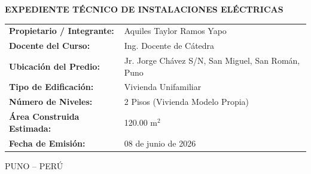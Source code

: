 \begin{titlepage}
\begin{minipage}{5.20in}
\vspace{0.40in}
{\fontsize{13}{16}\selectfont\bfseries EXPEDIENTE TÉCNICO DE INSTALACIONES ELÉCTRICAS\par}

\vspace{0.40in}
\begin{flushleft}
\fontsize{10}{13}\selectfont
\renewcommand{\arraystretch}{1.2}
\begin{tabular}{>{\bfseries}p{1.8in}l}
Propietario / Integrante: & Aquiles Taylor Ramos Yapo \\
Docente del Curso: & Ing. Docente de Cátedra \\
Ubicación del Predio: & Jr. Jorge Chávez S/N, San Miguel, San Román, Puno \\
Tipo de Edificación: & Vivienda Unifamiliar \\
Número de Niveles: & 2 Pisos (Vivienda Modelo Propia) \\
Área Construida Estimada: & 120.00 m\(^2\) \\
Fecha de Emisión: & 08 de junio de 2026 \\
\end{tabular}
\end{flushleft}

\vfill
{\fontsize{10}{12}\selectfont PUNO -- PERÚ\par}
{\fontsize{9}{11}\par}
\end{minipage}

\end{titlepage}
